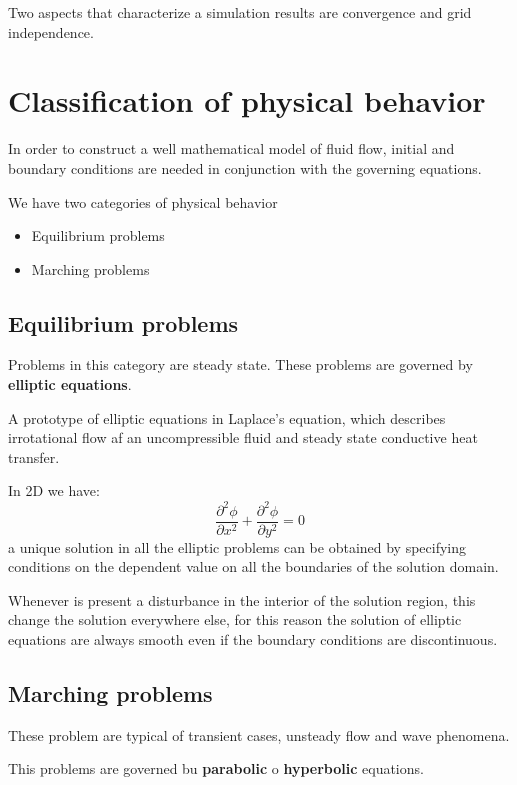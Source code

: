 \documentclass[a4paper, 15pt]{article}
\begin{document}
Two aspects that characterize a simulation results are convergence and grid independence.

\section{Classification of physical behavior}
In order to construct a well mathematical model of fluid flow, initial and boundary conditions are needed in conjunction with the governing equations. \newline 

We have two categories of physical behavior
\begin{itemize}
	\item Equilibrium problems
	\item Marching problems
\end{itemize}

\subsection*{Equilibrium problems}
Problems in this category are steady state. These problems are governed by \textbf{elliptic equations}. \newline 

A prototype of elliptic equations in Laplace's equation, which describes irrotational flow af an uncompressible fluid and steady state conductive heat transfer. 

In 2D we have:
\[\dfrac{\partial^2\phi}{\partial x^2} + \dfrac{\partial^2\phi}{\partial y^2} = 0\] 
a unique solution in all the elliptic problems can be obtained by specifying conditions on the dependent value on all the boundaries of the solution domain. \newline 

Whenever is present a disturbance in the interior of the solution region, this change the solution everywhere else, for this reason the solution of elliptic equations are always smooth even if the boundary conditions are discontinuous. 

\subsection*{Marching problems}
These problem are typical of transient cases, unsteady flow and wave phenomena. 

This problems are governed bu \textbf{parabolic} o \textbf{hyperbolic} equations. 
\end{document}
